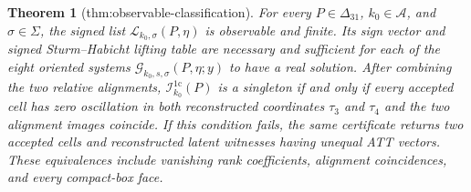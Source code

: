 \documentclass{article}
\newtheorem{theorem}{Theorem}
\begin{document}
\begin{theorem}[thm:observable-classification]\label{thm:observable-classification}
For every \(P\in\Delta_{31}\), \(k_0\in\mathcal A\), and \(\sigma\in\Sigma\), the signed list \(\mathscr L_{k_0,\sigma}(P,\eta)\) is observable and finite. Its sign vector and signed Sturm--Habicht lifting table are necessary and sufficient for each of the eight oriented systems \(\mathscr G_{k_0,s,\sigma}(P,\eta;y)\) to have a real solution. After combining the two relative alignments, \(\mathcal I_{k_0}^{1\mathrm c}(P)\) is a singleton if and only if every accepted cell has zero oscillation in both reconstructed coordinates \(\tau_3\) and \(\tau_4\) and the two alignment images coincide. If this condition fails, the same certificate returns two accepted cells and reconstructed latent witnesses having unequal ATT vectors. These equivalences include vanishing rank coefficients, alignment coincidences, and every compact-box face.
\end{theorem}
\end{document}
